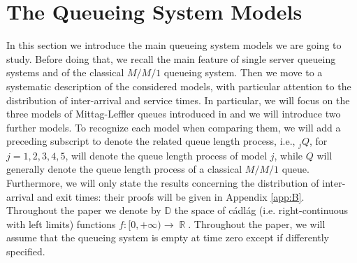 \documentclass[]{amsart}
\numberwithin{equation}{section}
\theoremstyle{remark}
\theoremstyle{definition}
\DeclareMathOperator{\R}{\mathbb{R}}
\begin{document}

\section{The Queueing System Models}\label{sec:models}
{In this section we introduce the main queueing system models we are going to study. Before doing that, we recall the main feature of single server queueing systems and of the classical $M/M/1$ queueing system. Then we move to a systematic description of the considered models, with particular attention to the distribution of inter-arrival and service times. In particular, we will focus on the three models of Mittag-Leffler queues introduced in \cite{butt2023queuing,cahoy2015transient} and we will introduce two further models.
To recognize each model when comparing them, we will add a preceding subscript to denote the related queue length process, i.e., ${}_jQ$, for $j=1,2,3,4,5$, will denote the queue length process of model $j$, while $Q$ will generally denote the queue length process of a classical $M/M/1$ queue. Furthermore, we will only state the results concerning the distribution of inter-arrival and exit times: their proofs will be given in Appendix \ref{app:B}. Throughout the paper we denote by $\mathbb{D}$ the space of c\'adl\'ag (i.e. right-continuous with left limits) functions $f:[0,+\infty) \to \R$.} {Throughout the paper, we will assume that the queueing system is empty at time zero except if differently specified.}
\end{document}
